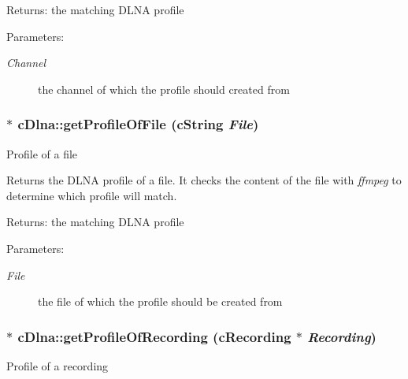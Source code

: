 \begin{Desc}
\item[Returns:]the matching DLNA profile \end{Desc}
\begin{Desc}
\item[Parameters:]
\begin{description}
\item[{\em Channel}]the channel of which the profile should created from \end{description}
\end{Desc}
\hypertarget{classcDlna_4b5c30f707060b66c3980af70b7d8d08}{
\subsubsection[{getProfileOfFile}]{ $\ast$ cDlna::getProfileOfFile (cString {\em File})}}
\label{classcDlna_4b5c30f707060b66c3980af70b7d8d08}


Profile of a file

Returns the DLNA profile of a file. It checks the content of the file with {\em ffmpeg\/} to determine which profile will match.

\begin{Desc}
\item[Returns:]the matching DLNA profile \end{Desc}
\begin{Desc}
\item[Parameters:]
\begin{description}
\item[{\em File}]the file of which the profile should be created from \end{description}
\end{Desc}
\hypertarget{classcDlna_69dc71fe30130cafa399bb851ef5def8}{
\subsubsection[{getProfileOfRecording}]{ $\ast$ cDlna::getProfileOfRecording (cRecording $\ast$ {\em Recording})}}
\label{classcDlna_69dc71fe30130cafa399bb851ef5def8}


Profile of a recording

